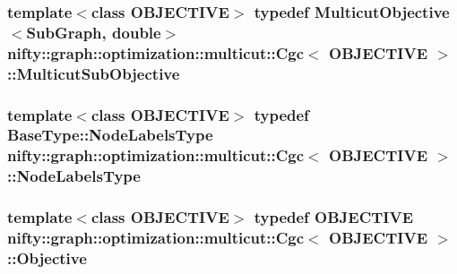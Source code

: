 \subsubsection[{Multicut\+Sub\+Objective}]{\setlength{\rightskip}{0pt plus 5cm}template$<$class O\+B\+J\+E\+C\+T\+I\+V\+E$>$ typedef {\bf Multicut\+Objective}$<${\bf Sub\+Graph}, double$>$ {\bf nifty\+::graph\+::optimization\+::multicut\+::\+Cgc}$<$ O\+B\+J\+E\+C\+T\+I\+V\+E $>$\+::{\bf Multicut\+Sub\+Objective}}\label{classnifty_1_1graph_1_1optimization_1_1multicut_1_1Cgc_a437e2332f586cdb3f4ee55e3cf1ea224}
\hypertarget{classnifty_1_1graph_1_1optimization_1_1multicut_1_1Cgc_a2976a0116b64803813b4b0c1555a2e70}{}
\subsubsection[{Node\+Labels\+Type}]{\setlength{\rightskip}{0pt plus 5cm}template$<$class O\+B\+J\+E\+C\+T\+I\+V\+E$>$ typedef {\bf Base\+Type\+::\+Node\+Labels\+Type} {\bf nifty\+::graph\+::optimization\+::multicut\+::\+Cgc}$<$ O\+B\+J\+E\+C\+T\+I\+V\+E $>$\+::{\bf Node\+Labels\+Type}}\label{classnifty_1_1graph_1_1optimization_1_1multicut_1_1Cgc_a2976a0116b64803813b4b0c1555a2e70}
\hypertarget{classnifty_1_1graph_1_1optimization_1_1multicut_1_1Cgc_ac3e728f92d355814ff3b40b5f7d59123}{}
\subsubsection[{Objective}]{\setlength{\rightskip}{0pt plus 5cm}template$<$class O\+B\+J\+E\+C\+T\+I\+V\+E$>$ typedef O\+B\+J\+E\+C\+T\+I\+V\+E {\bf nifty\+::graph\+::optimization\+::multicut\+::\+Cgc}$<$ O\+B\+J\+E\+C\+T\+I\+V\+E $>$\+::{\bf Objective}}\label{classnifty_1_1graph_1_1optimization_1_1multicut_1_1Cgc_ac3e728f92d355814ff3b40b5f7d59123}
\hypertarget{classnifty_1_1graph_1_1optimization_1_1multicut_1_1Cgc_a10339a861b453cdeb2e85e8371bd013d}{}

